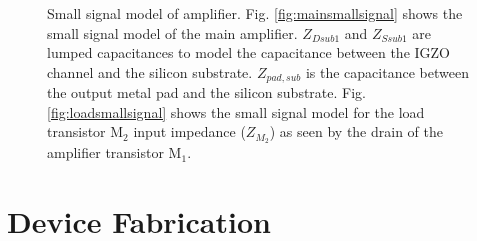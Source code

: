 \documentclass[conference]{IEEEtran}
\begin{document}
\begin{figure}[htbp]
    \centering
    \par
    \quad
    \caption{
        Small signal model of amplifier.
        Fig. \ref{fig:mainsmallsignal} shows the small signal model of the main amplifier.
        $Z_{Dsub1}$ and $Z_{Ssub1}$ are lumped capacitances to model the capacitance between the IGZO channel and the silicon substrate.
        $Z_{pad,sub}$ is the capacitance between the output metal pad and the silicon substrate.
        Fig. \ref{fig:loadsmallsignal} shows the small signal model for the load transistor M$_2$ input impedance ($Z_{M_2}$) as seen by the drain of the amplifier transistor M$_1$.
    }
    \label{fig:smallsignal}
\end{figure}

\section{Device Fabrication}
\end{document}
